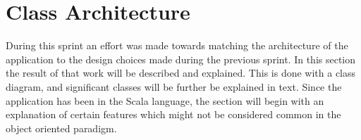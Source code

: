 \section{Class Architecture}

During this sprint an effort was made towards matching the architecture of the application to the design choices made during the previous sprint. In this section the result of that work will be described and explained. This is done with a class diagram, and significant classes will be further be explained in text. Since the application has been in the Scala language, the section will begin with an explanation of certain features which might not be considered common in the object oriented paradigm.





